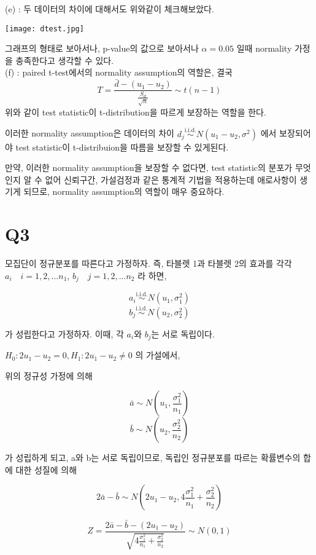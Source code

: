 \documentclass{article}
\begin{document}
(e) : 두 데이터의 차이에 대해서도 위와같이 체크해보았다.

\begin{center}
    \texttt{[image: dtest.jpg]}
\end{center} 

그래프의 형태로 보아서나, p-value의 값으로 보아서나 $\alpha = 0.05$ 일때 normality 가정을 충족한다고 생각할 수 있다. \\ 



(f) : paired t-test에서의 normality assumption의 역할은, 결국  $$ T = \frac{\bar{d} - (u_1 - u_2)}{\frac{S_d}{\sqrt{n}}} \sim t(n-1) $$
위와 같이 test statistic이 t-distribution을 따르게 보장하는 역할을 한다. 

이러한 normality assumption은 데이터의 차이  $d_j\overset{\text{i.i.d.}}{\sim} N(u_1 - u_2,\sigma^2)$ 에서 보장되어야 
test statistic이 t-distribuion을 따름을 보장할 수 있게된다.

만약, 이러한 normality assumption을 보장할 수 없다면, test statistic의 분포가 무엇인지 알 수 없어 신뢰구간, 가설검정과 같은 통계적 기법을 적용하는데 애로사항이 생기게 되므로, normality assumption의 역할이 매우 중요하다.

\section{Q3}

모집단이 정규분포를 따른다고 가정하자. 즉, 타블렛 1과 타블렛 2의 효과를 각각\\
$a_i \quad i = 1, 2, ... n_1$, $b_j \quad j = 1, 2, ... n_2$ 라 하면,

$$a_i\overset{\text{i.i.d.}}{\sim} N(u_1,\sigma_1^2)$$
$$b_j\overset{\text{i.i.d.}}{\sim} N(u_2,\sigma_2^2)$$

가 성립한다고 가정하자. 이때, 각 $a_i$와 $b_j$는 서로 독립이다.

$ H_0 : 2u_1 - u_2 = 0, H_1 : 2u_1 - u_2 \neq 0 $ 의 가설에서,

위의 정규성 가정에 의해

$$\bar{a} \sim N(u_1, \frac{\sigma_1^2}{n_1}) $$
$$\bar{b} \sim N(u_2, \frac{\sigma_2^2}{n_2}) $$

가 성립하게 되고, a와 b는 서로 독립이므로, 독립인 정규분포를 따르는 확률변수의 합에 대한 성질에 의해


$$2\bar{a} - \bar{b} \sim N(2u_1 - u_2, 4\frac{\sigma_1^2}{n_1} + \frac{\sigma_2^2}{n_2})  $$

$$ Z = \frac{2\bar{a} - \bar{b} - (2u_1 - u_2)}{\sqrt{4\frac{\sigma_1^2}{n_1} + \frac{\sigma_2^2}{n_2}}} \sim N(0,1) $$ 
\end{document}
